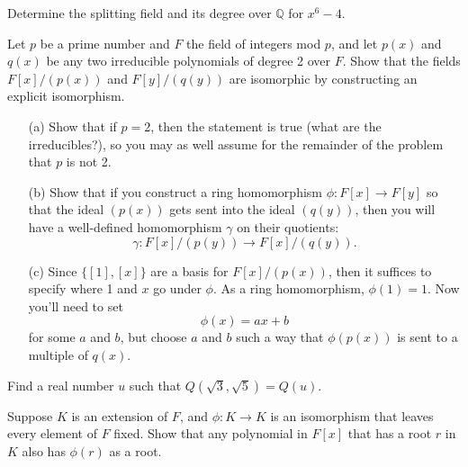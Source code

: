 \documentclass[12pt,letterpaper]{hmcpset}
\newcommand{\Qq}{\mathbb{Q}}
\begin{document}

\begin{problem}[13.4.4]
  Determine the splitting field and its degree over $\Qq$ for $x^6-4$.
\end{problem}
\begin{solution}
\vfill
\end{solution}
\newpage

\begin{problem}[B.]
  Let $p$ be a prime number and $F$ the field of integers mod $p$, and let $p(x)$ and $q(x)$ be any two irreducible polynomials of degree 2 over $F$. Show that the fields $F[x]/(p(x))$ and $F[y]/(q(y))$ are isomorphic by constructing an explicit isomorphism.
  \begin{enumerate}
    \item[(a)] Show that if $p=2$, then the statement is true (what are the irreducibles?), so you may as well assume for the remainder of the problem that $p$ is not 2.
    \item[(b)] Show that if you construct a ring homomorphism $\phi : F[x] \to F[y]$ so that the ideal $(p(x))$ gets sent into the ideal $(q(y))$, then you will have a well-defined homomorphism $\gamma$ on their quotients: $$ \gamma: F[x]/(p(y)) \to F[x]/(q(y)).$$
    \item[(c)] Since $\{[1], [x]\}$ are a basis for $F[x]/(p(x))$, then it suffices to specify where 1 and $x$ go under $\phi$. As a ring homomorphism, $\phi(1)=1$.  Now you'll need to set $$\phi(x) = ax+b $$ for some $a$ and $b$, but choose $a$ and $b$ such a way that $\phi(p(x))$ is sent to a multiple of $q(x)$.
  \end{enumerate}
\end{problem}
\begin{solution}
	\vfill
\end{solution}
\newpage

\begin{problem}[C.]
  Find a real number $u$ such that $Q(\sqrt{3},\sqrt{5})=Q(u)$.
\end{problem}
\begin{solution}
	\vfill
\end{solution}
\newpage

\begin{problem}[D.]
	Suppose $K$ is an extension of $F$, and $\phi : K \to K$ is an isomorphism that leaves every element of $F$ fixed. Show that any polynomial in $F[x]$ that has a root $r$ in $K$ also has $\phi(r)$ as a root.
\end{problem}
\begin{solution}
	\vfill
\end{solution}
\end{document}
